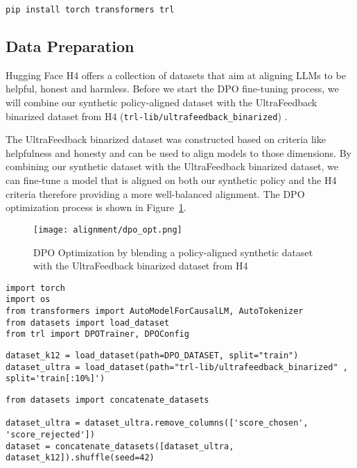 \begin{verbatim}
pip install torch transformers trl
\end{verbatim}



\subsection{Data Preparation}
Hugging Face H4  offers a collection of datasets that aim at aligning LLMs to be helpful, honest and harmless. Before we start the DPO fine-tuning process, we will combine our synthetic policy-aligned dataset with the UltraFeedback binarized dataset from H4 (\texttt{trl-lib/ultrafeedback\_binarized}) .

The UltraFeedback binarized dataset was constructed based on criteria like helpfulness and honesty and can be used to align models to those dimensions. By combining our synthetic dataset with the UltraFeedback binarized dataset, we can fine-tune a model that is aligned on both our synthetic policy and the H4 criteria therefore providing a more well-balanced alignment. The DPO optimization process is shown in Figure~\ref{fig:dpo-optimization}.

\begin{figure}[H]
\centering
\texttt{[image: alignment/dpo\_opt.png]}
\caption{DPO Optimization by blending a policy-aligned synthetic dataset with the UltraFeedback binarized dataset from H4}
\label{fig:dpo-optimization}
\end{figure}

\begin{verbatim}
import torch
import os
from transformers import AutoModelForCausalLM, AutoTokenizer
from datasets import load_dataset
from trl import DPOTrainer, DPOConfig
\end{verbatim}

\begin{verbatim}
dataset_k12 = load_dataset(path=DPO_DATASET, split="train")
dataset_ultra = load_dataset(path="trl-lib/ultrafeedback_binarized" , split='train[:10%]')
\end{verbatim}

\begin{verbatim}
from datasets import concatenate_datasets

dataset_ultra = dataset_ultra.remove_columns(['score_chosen', 'score_rejected'])
dataset = concatenate_datasets([dataset_ultra, dataset_k12]).shuffle(seed=42)
\end{verbatim}


